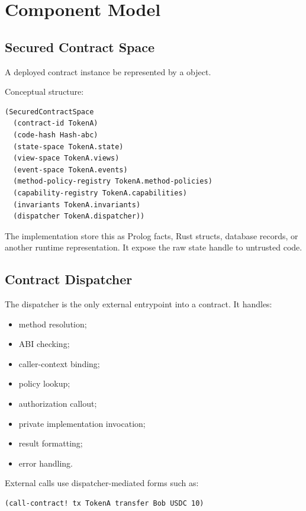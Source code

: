 \section{Component Model}

\subsection{Secured Contract Space}

A deployed contract instance \MUST{} be represented by a \SCS{} object.

Conceptual structure:

\begin{lstlisting}
(SecuredContractSpace
  (contract-id TokenA)
  (code-hash Hash-abc)
  (state-space TokenA.state)
  (view-space TokenA.views)
  (event-space TokenA.events)
  (method-policy-registry TokenA.method-policies)
  (capability-registry TokenA.capabilities)
  (invariants TokenA.invariants)
  (dispatcher TokenA.dispatcher))
\end{lstlisting}

The implementation \MAY{} store this as Prolog facts, Rust structs, database records, or another runtime representation. It \MUSTNOT{} expose the raw state handle to untrusted \MeTTa{} code.

\subsection{Contract Dispatcher}

The dispatcher is the only external entrypoint into a contract. It handles:

\begin{itemize}
  \item method resolution;
  \item ABI checking;
  \item caller-context binding;
  \item policy lookup;
  \item authorization callout;
  \item private implementation invocation;
  \item result formatting;
  \item error handling.
\end{itemize}

External calls \MUST{} use dispatcher-mediated forms such as:

\begin{lstlisting}
(call-contract! tx TokenA transfer Bob USDC 10)
\end{lstlisting}

